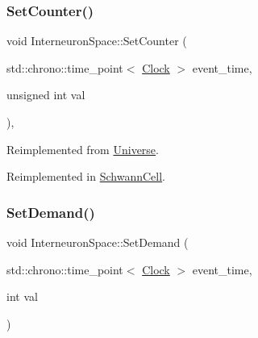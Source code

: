 \mbox{\label{classInterneuronSpace_a60a46f22a2e575d65031635a698a60a9}} 
\subsubsection{\texorpdfstring{Set\+Counter()}{SetCounter()}}
{\footnotesize\ttfamily void Interneuron\+Space\+::\+Set\+Counter (\begin{DoxyParamCaption}\item[{std\+::chrono\+::time\+\_\+point$<$ \mbox{\hyperlink{universe_8h_a0ef8d951d1ca5ab3cfaf7ab4c7a6fd80}{Clock}} $>$}]{event\+\_\+time,  }\item[{unsigned int}]{val }\end{DoxyParamCaption})\hspace{0.3cm}{\ttfamily [inline]}, {\ttfamily [virtual]}}



Reimplemented from \mbox{\hyperlink{classUniverse_aa22202ae740eb1355529afcb13285e91}{Universe}}.



Reimplemented in \mbox{\hyperlink{classSchwannCell_a067f87983cb937d5fdb882c267e27921}{Schwann\+Cell}}.

\mbox{\label{classInterneuronSpace_ad2225077a049e78ce583a79eee2d373f}} 
\subsubsection{\texorpdfstring{Set\+Demand()}{SetDemand()}}
{\footnotesize\ttfamily void Interneuron\+Space\+::\+Set\+Demand (\begin{DoxyParamCaption}\item[{std\+::chrono\+::time\+\_\+point$<$ \mbox{\hyperlink{universe_8h_a0ef8d951d1ca5ab3cfaf7ab4c7a6fd80}{Clock}} $>$}]{event\+\_\+time,  }\item[{int}]{val }\end{DoxyParamCaption})}

\mbox{\label{classInterneuronSpace_a7fc404aae98d45ccad26b5c186fab6e2}} 
